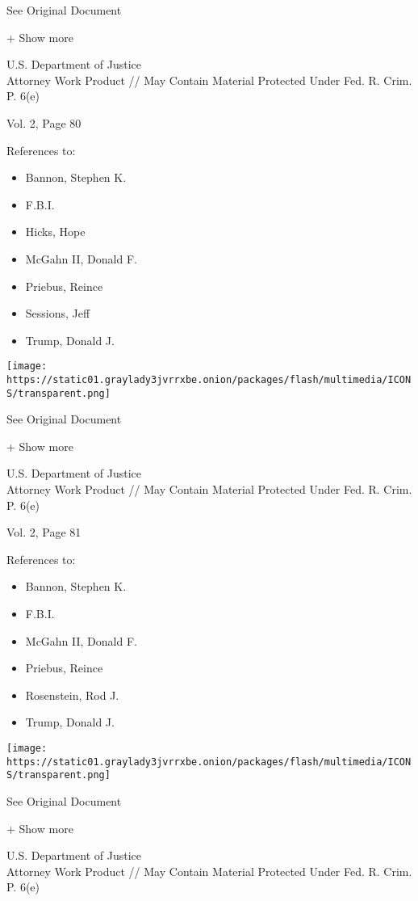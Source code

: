 See Original Document

+ Show more

U.S. Department of Justice\\
Attorney Work Product // May Contain Material Protected Under Fed. R.
Crim. P. 6(e)

Vol. 2, Page 80

References to:

\begin{itemize}
\tightlist
\item
  Bannon, Stephen K.
\item
  F.B.I.
\item
  Hicks, Hope
\item
  McGahn II, Donald F.
\item
  Priebus, Reince
\item
  Sessions, Jeff
\item
  Trump, Donald J.
\end{itemize}

\protect\hyperlink{}{}

\texttt{[image: https://static01.graylady3jvrrxbe.onion/packages/flash/multimedia/ICONS/transparent.png]}

See Original Document

+ Show more

U.S. Department of Justice\\
Attorney Work Product // May Contain Material Protected Under Fed. R.
Crim. P. 6(e)

Vol. 2, Page 81

References to:

\begin{itemize}
\tightlist
\item
  Bannon, Stephen K.
\item
  F.B.I.
\item
  McGahn II, Donald F.
\item
  Priebus, Reince
\item
  Rosenstein, Rod J.
\item
  Trump, Donald J.
\end{itemize}

\protect\hyperlink{}{}

\texttt{[image: https://static01.graylady3jvrrxbe.onion/packages/flash/multimedia/ICONS/transparent.png]}

See Original Document

+ Show more

U.S. Department of Justice\\
Attorney Work Product // May Contain Material Protected Under Fed. R.
Crim. P. 6(e)

